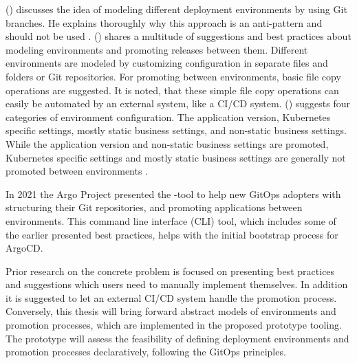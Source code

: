 \noindent
\citeauthor{codefreshStopUsingBranchesGitOpsEnvironments} (\citeyear{codefreshStopUsingBranchesGitOpsEnvironments})
discusses
the idea of
modeling different deployment environments by using Git branches.
He
explains thoroughly why this approach is an anti-pattern and should not be used
\autocite{codefreshStopUsingBranchesGitOpsEnvironments}.
\citeauthor{codefreshHowToModelGitOpsEnvironmentsAndPromote} (\citeyear{codefreshHowToModelGitOpsEnvironmentsAndPromote})
shares
a multitude of suggestions and best practices
about modeling environments and promoting releases between them.
Different environments are modeled by customizing \autocite{kustomizeIoWebsite} configuration 
in separate files and folders or Git repositories.
For promoting between environments, basic file copy operations are suggested.
It is noted, that these simple file copy operations can easily be automated by an external system,
like a CI/CD system.
\citeauthor{codefreshHowToModelGitOpsEnvironmentsAndPromote} (\citeyear{codefreshHowToModelGitOpsEnvironmentsAndPromote})
suggests four categories of environment configuration.
The application version,
Kubernetes specific settings,
mostly static business settings,
and 
non-static business settings.
While the application version and non-static business settings are promoted,
Kubernetes specific settings and mostly static business settings are generally not promoted between environments
\autocite{codefreshHowToModelGitOpsEnvironmentsAndPromote}.
\bigskip

\noindent
In 2021 the
Argo Project \autocite{argoProjWebsite}
presented the
-tool \autocite{argocdAutopilotWebsite}
to help new GitOps adopters with
structuring their Git repositories,
and
promoting applications between environments.
This command line interface (CLI) tool,
which includes some of the earlier presented best practices,
helps with the initial bootstrap process for ArgoCD.
\bigskip


\noindent
Prior research on the concrete problem is focused on presenting
best practices and suggestions
which users need to manually implement themselves.
In addition it is suggested to let an external CI/CD system handle the promotion process.
Conversely, this thesis will bring forward
abstract models of environments and promotion processes,
which are implemented in the proposed prototype tooling.
The prototype will assess the feasibility of
defining deployment environments and promotion processes declaratively,
following the GitOps principles.






